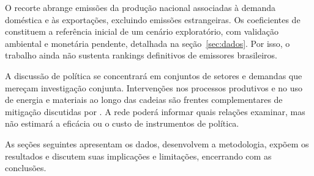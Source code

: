 O recorte abrange emissões da produção nacional associadas à demanda doméstica e às exportações, excluindo emissões estrangeiras. Os coeficientes de \textcite{sanguinetAzzoni2024} constituem a referência inicial de um cenário exploratório, com validação ambiental e monetária pendente, detalhada na seção~\ref{sec:dados}. Por isso, o trabalho ainda não sustenta rankings definitivos de emissores brasileiros.

A discussão de política se concentrará em conjuntos de setores e demandas que mereçam investigação conjunta. Intervenções nos processos produtivos e no uso de energia e materiais ao longo das cadeias são frentes complementares de mitigação discutidas por \textcite{rissman2020}. A rede poderá informar quais relações examinar, mas não estimará a eficácia ou o custo de instrumentos de política.

As seções seguintes apresentam os dados, desenvolvem a metodologia, expõem os resultados e discutem suas implicações e limitações, encerrando com as conclusões.
